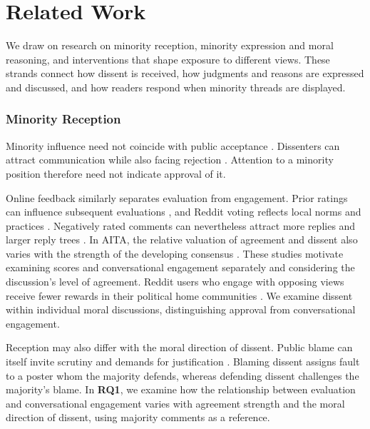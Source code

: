 \section{Related Work}
\label{sec:related-work}

We draw on research on minority reception, minority expression and moral
reasoning, and interventions that shape exposure to different views.
These strands connect how dissent is received, how judgments and reasons
are expressed and discussed, and how readers respond when minority
threads are displayed.

\subsubsection*{Minority Reception}

Minority influence need not coincide with public acceptance
\cite{wood1994minority}. Dissenters can attract communication while also
facing rejection \cite{schachter1951deviation}. Attention to a minority
position therefore need not indicate approval of it.

Online feedback similarly separates evaluation from engagement. Prior
ratings can influence subsequent evaluations \cite{muchnik2013social},
and Reddit voting reflects local norms and practices
\cite{graham2021sociomateriality}. Negatively rated comments can
nevertheless attract more replies and larger reply trees
\cite{davis2021emotional}. In AITA, the relative valuation of agreement
and dissent also varies with the strength of the developing consensus
\cite{mellody2025consensus}. These studies motivate examining scores and
conversational engagement separately and considering the discussion's
level of agreement.
Reddit users who engage with opposing views receive fewer rewards in their political home communities \cite{Efstratiou2024}. We examine dissent within individual moral discussions, distinguishing approval from conversational engagement.

Reception may also differ with the moral direction of dissent. Public
blame can itself invite scrutiny and demands for justification
\cite{malle2022socially}. Blaming dissent assigns fault to a poster whom
the majority defends, whereas defending dissent challenges the
majority's blame. In \textbf{RQ1}, we examine how the relationship between
evaluation and conversational engagement varies with agreement strength
and the moral direction of dissent, using majority comments as a
reference.

